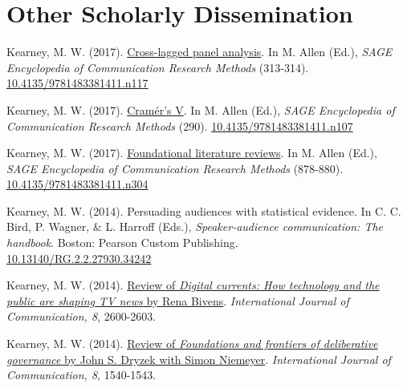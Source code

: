 \section{Other Scholarly Dissemination}
\begin{bibenum}

\item[] Kearney, M. W. (2017).
	\href{http://mikewk.com/clpm.pdf}{Cross-lagged panel analysis}.
	In M. Allen (Ed.), \textit{SAGE Encyclopedia of Communication Research Methods} (313-314).
	\href{http://dx.doi.org/10.4135/9781483381411.n117}{10.4135/9781483381411.n117}

\item[] Kearney, M. W. (2017).
	\href{http://mikewk.com/cramersv.pdf}{Cram\'{e}r's V}.
	In M. Allen (Ed.), \textit{SAGE Encyclopedia of Communication Research Methods} (290).
	\href{http://dx.doi.org/10.4135/9781483381411.n107}{10.4135/9781483381411.n107}

\item[] Kearney, M. W. (2017).
	\href{http://mikewk.com/flr.pdf}{Foundational literature reviews}.
	In M. Allen (Ed.), \textit{SAGE Encyclopedia of Communication Research Methods} (878-880).
	\href{http://dx.doi.org/10.4135/9781483381411.n304}{10.4135/9781483381411.n304}

\item[] Kearney, M. W. (2014).
  Persuading audiences with statistical evidence.
	In C. C. Bird, P. Wagner, \& L. Harroff (Eds.),
	\textit{Speaker-audience communication: The handbook}. Boston: Pearson Custom Publishing.\\
	\href{https://dx.doi.org/10.13140/RG.2.2.27930.34242}{10.13140/RG.2.2.27930.34242}

\item[] Kearney, M. W. (2014).
  \href{http://ijoc.org/index.php/ijoc/article/view/3405/1280}{Review of
  \textit{Digital currents: How technology and the public are shaping TV news} by Rena Bivens}.
  \textit{International Journal of Communication, 8}, 2600-2603.

\item[] Kearney, M. W. (2014).
  \href{http://ijoc.org/index.php/ijoc/article/view/2899/1147}{Review of
  \textit{Foundations and frontiers of deliberative governance} by John S. Dryzek with Simon Niemeyer}.
  \textit{International Journal of Communication, 8}, 1540-1543.

\end{bibenum}
